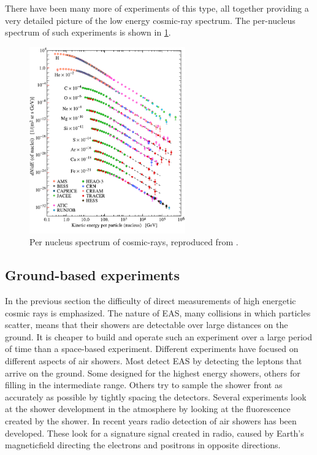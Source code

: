 There have been many more of experiments of this type, all together providing a very detailed picture of the low energy cosmic-ray spectrum. The per-nucleus spectrum of such experiments is shown in \cref{fig:low_e_spectrum}.

\begin{figure}
    \centering
    \includegraphics[width=0.6\textwidth]
                    {plots/cosmic-rays/PDG_28_1_fluxes_per_nucleus}
    \caption{Per nucleus spectrum of cosmic-rays, reproduced from \cite{olive2014pdg}.}
    \label{fig:low_e_spectrum}
\end{figure}


\subsection{Ground-based experiments}

In the previous section the difficulty of direct measurements of high energetic cosmic rays is emphasized. The nature of EAS, many collisions in which particles scatter, means that their showers are detectable over large distances on the ground. It is cheaper to build and operate such an experiment over a large period of time than a space-based experiment. Different experiments have focused on different aspects of air showers. Most detect EAS by detecting the leptons that arrive on the ground. Some designed for the highest energy showers, others for filling in the intermediate range. Others try to sample the shower front as accurately as possible by tightly spacing the detectors. Several experiments look at the shower development in the atmosphere by looking at the fluorescence created by the shower. In recent years radio detection of air showers has been developed. These look for a signature signal created in radio, caused by Earth's magneticfield directing the electrons and positrons in opposite directions.

